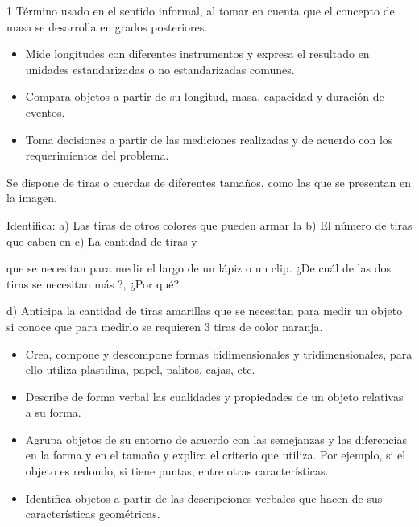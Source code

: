 1 Término usado en el sentido informal, al tomar en cuenta que el concepto de masa se desarrolla en grados posteriores.


\evidencias

\begin{itemize}
  \item Mide longitudes con diferentes instrumentos y expresa el resultado en unidades estandarizadas o no estandarizadas comunes.
  \item Compara objetos a partir de su longitud, masa, capacidad y duración de eventos.
  \item Toma decisiones a partir de las mediciones realizadas y de acuerdo con los requerimientos del problema.
\end{itemize}

\ejemplo

Se dispone de tiras o cuerdas de diferentes tamaños, como las que se presentan en la imagen.


Identifica: a) Las tiras de otros colores que pueden armar la b) El número de tiras que caben en c) La cantidad de tiras y


que se necesitan para medir el largo de un lápiz o un clip. ¿De cuál de las dos tiras se necesitan más ?, ¿Por qué?

d) Anticipa la cantidad de tiras amarillas que se necesitan para medir un objeto si conoce que para medirlo se requieren 3 tiras de color naranja.


\evidencias

\begin{itemize}
  \item Crea, compone y descompone formas bidimensionales y tridimensionales, para ello utiliza plastilina, papel, palitos, cajas, etc.
  \item Describe de forma verbal las cualidades y propiedades de un objeto relativas a su forma.
  \item Agrupa objetos de su entorno de acuerdo con las semejanzas y las diferencias en la forma y en el tamaño y explica el criterio que utiliza. Por ejemplo, si el objeto es redondo, si tiene puntas, entre otras características.
  \item Identifica objetos a partir de las descripciones verbales que hacen de sus características geométricas.
\end{itemize}

